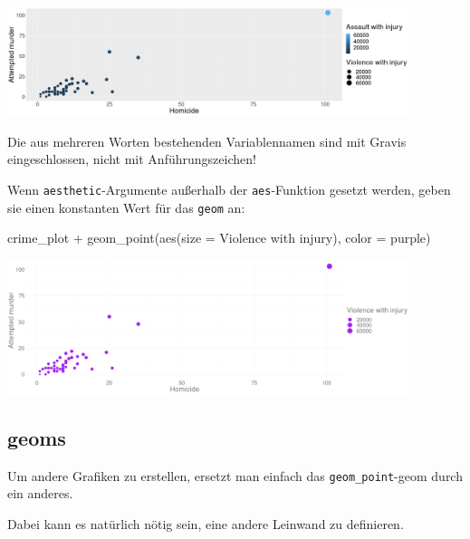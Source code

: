 \documentclass[
]{book}
\newenvironment{Shaded}{\begin{snugshade}}{\end{snugshade}}
\newcommand{\AttributeTok}[1]{\textcolor[rgb]{0.77,0.63,0.00}{#1}}
\newcommand{\FunctionTok}[1]{\textcolor[rgb]{0.00,0.00,0.00}{#1}}
\newcommand{\NormalTok}[1]{#1}
\newcommand{\SpecialCharTok}[1]{\textcolor[rgb]{0.00,0.00,0.00}{#1}}
\newcommand{\StringTok}[1]{\textcolor[rgb]{0.31,0.60,0.02}{#1}}
\begin{document}
\begin{center}\includegraphics[width=333.333333333333pt]{imgs/pts2} \end{center}

Die aus mehreren Worten bestehenden Variablennamen sind mit Gravis eingeschlossen, nicht mit Anführungszeichen!

Wenn \texttt{aesthetic}-Argumente außerhalb der \texttt{aes}-Funktion gesetzt werden, geben sie einen konstanten Wert für das \texttt{geom} an:

\begin{Shaded}
\begin{Highlighting}[]
\NormalTok{crime\_plot }\SpecialCharTok{+} \FunctionTok{geom\_point}\NormalTok{(}\FunctionTok{aes}\NormalTok{(}\AttributeTok{size =} \StringTok{\textasciigrave{}}\AttributeTok{Violence with injury}\StringTok{\textasciigrave{}}\NormalTok{), }
                            \AttributeTok{color =} \StringTok{\textquotesingle{}purple\textquotesingle{}}\NormalTok{)}
\end{Highlighting}
\end{Shaded}

\begin{center}\includegraphics[width=333.333333333333pt]{imgs/pts3} \end{center}

\hypertarget{geoms}{%
\subsection{geoms}\label{geoms}}

Um andere Grafiken zu erstellen, ersetzt man einfach das \texttt{geom\_point}-geom durch ein anderes.

Dabei kann es natürlich nötig sein, eine andere Leinwand zu definieren.
\end{document}
